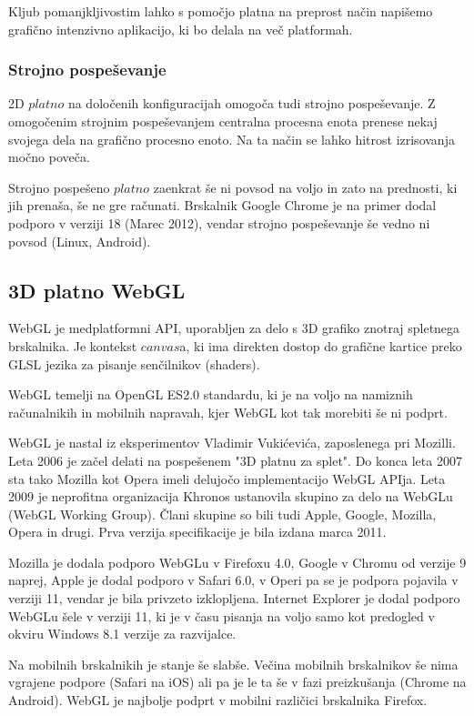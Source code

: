 Kljub pomanjkljivostim lahko s pomočjo platna na preprost način napišemo grafično intenzivno aplikacijo, ki bo delala na več platformah. 

\subsubsection{Strojno pospeševanje}

2D $platno$ na določenih konfiguracijah omogoča tudi strojno pospeševanje. Z omogočenim strojnim pospeševanjem centralna procesna enota prenese nekaj svojega dela na grafično procesno enoto. Na ta način se lahko hitrost izrisovanja močno poveča.

Strojno pospešeno $platno$ zaenkrat še ni povsod na voljo in zato na prednosti, ki jih prenaša, še ne gre računati. Brskalnik Google Chrome je na primer dodal podporo v verziji 18 (Marec 2012), vendar strojno pospeševanje še vedno ni povsod (Linux, Android).

\subsection{3D platno WebGL}

WebGL je medplatformni API, uporabljen za delo s 3D grafiko znotraj spletnega brskalnika. Je kontekst $canvas$a, ki ima direkten dostop do grafične kartice preko GLSL jezika za pisanje senčilnikov (shaders). 

WebGL temelji na OpenGL ES2.0 standardu, ki je na voljo na namiznih računalnikih in mobilnih napravah, kjer WebGL kot tak morebiti še ni podprt.

WebGL je nastal iz eksperimentov Vladimir Vukićevića, zaposlenega pri Mozilli. Leta 2006 je začel delati na pospešenem "3D platnu za splet". Do konca leta 2007 sta tako Mozilla kot Opera imeli delujočo implementacijo WebGL APIja. Leta 2009 je neprofitna organizacija Khronos ustanovila skupino za delo na WebGLu (WebGL Working Group). Člani skupine so bili tudi Apple, Google, Mozilla, Opera in drugi. Prva verzija specifikacije je bila izdana marca 2011.

Mozilla je dodala podporo WebGLu v Firefoxu 4.0, Google v Chromu od verzije 9 naprej, Apple je dodal podporo v Safari 6.0, v Operi pa se je podpora pojavila v verziji 11, vendar je bila privzeto izklopljena. Internet Explorer je dodal podporo WebGLu šele v verziji 11, ki je v času pisanja na voljo samo kot predogled v okviru Windows 8.1 verzije za razvijalce.

Na mobilnih brskalnikih je stanje še slabše. Večina mobilnih brskalnikov še nima vgrajene podpore (Safari na iOS) ali pa je le ta še v fazi preizkušanja (Chrome na Android). WebGL je najbolje podprt v mobilni različici brskalnika Firefox.


